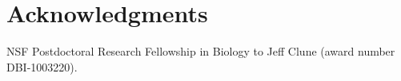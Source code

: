 \section{Acknowledgments}

NSF Postdoctoral Research Fellowship in Biology to Jeff Clune (award number DBI-1003220).


